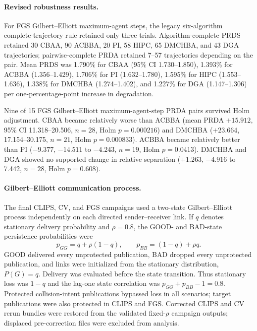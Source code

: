 \paragraph{Revised robustness results.}
For FGS Gilbert--Elliott maximum-agent steps, the legacy six-algorithm complete-trajectory rule retained only three trials.  Algorithm-complete PRDS retained 30 CBAA, 90 ACBBA, 20 PI, 58 HIPC, 65 DMCHBA, and 43 DGA trajectories; pairwise-complete PRDA retained 7--57 trajectories depending on the pair.  Mean PRDS was 1.790\% for CBAA (95\% CI 1.730--1.850), 1.393\% for ACBBA (1.356--1.429), 1.706\% for PI (1.632--1.780), 1.595\% for HIPC (1.553--1.636), 1.338\% for DMCHBA (1.274--1.402), and 1.227\% for DGA (1.147--1.306) per one-percentage-point increase in degradation.

Nine of 15 FGS Gilbert--Elliott maximum-agent-step PRDA pairs survived Holm adjustment.  CBAA became relatively worse than ACBBA (mean PRDA $+15.912$, 95\% CI 11.318--20.506, $n=28$, Holm $p=0.000216$) and DMCHBA ($+23.664$, 17.154--30.175, $n=21$, Holm $p=0.000833$).  ACBBA became relatively better than PI ($-9.377$, $-14.511$ to $-4.243$, $n=19$, Holm $p=0.0413$).  DMCHBA and DGA showed no supported change in relative separation ($+1.263$, $-4.916$ to 7.442, $n=28$, Holm $p=0.608$).

\paragraph{Gilbert--Elliott communication process.}
The final CLIPS, CV, and FGS campaigns used a two-state Gilbert--Elliott process independently on each directed sender--receiver link.  If $q$ denotes stationary delivery probability and $\rho=0.8$, the GOOD- and BAD-state persistence probabilities were
\begin{equation}
  p_{GG}=q+\rho(1-q), \qquad p_{BB}=(1-q)+\rho q.
\end{equation}
GOOD delivered every unprotected publication, BAD dropped every unprotected publication, and links were initialized from the stationary distribution, $P(G)=q$.  Delivery was evaluated before the state transition.  Thus stationary loss was $1-q$ and the lag-one state correlation was $p_{GG}+p_{BB}-1=0.8$.  Protected collision-intent publications bypassed loss in all scenarios; target publications were also protected in CLIPS and FGS.  Corrected CLIPS and CV rerun bundles were restored from the validated fixed-$\rho$ campaign outputs; displaced pre-correction files were excluded from analysis.

